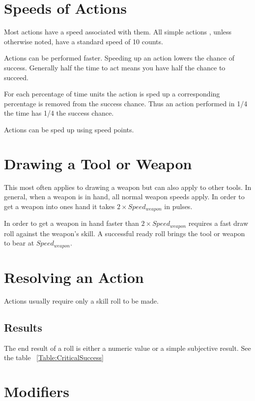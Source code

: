 \section{Speeds of Actions}

Most actions have a speed associated with them. All simple actions 
, unless otherwise noted, have a standard speed of 10 counts. 
 



Actions can be performed faster. Speeding up an action lowers the
chance of success. Generally half the time to act means you have half the chance to succeed.

For each percentage of time units the action is sped up a corresponding percentage is removed from 
the success chance. Thus an action performed in 1/4 the time has 1/4 the success chance.

Actions can be sped up using speed points. 

\section{Drawing a Tool or Weapon}

This most often applies to drawing a weapon but can also apply to 
other tools. In general, when a weapon is in hand, all normal weapon 
speeds apply. In order to get a weapon into ones hand it takes 
\( 2 \times Speed_{weapon} \) in pulses. 

In order to get a weapon in hand faster than \( 2 \times 
Speed_{weapon} \) requires a fast draw roll against the weapon's 
skill. A successful ready roll brings the tool or weapon to bear at 
\( Speed_{weapon} \).

\section{Resolving an Action}

Actions usually require only a skill roll to be made. 

\subsection{Results}

The end result of a roll is either a numeric value or a simple 
subjective result. See the table ~\ref{Table:CriticalSuccess}

\section{Modifiers} 

